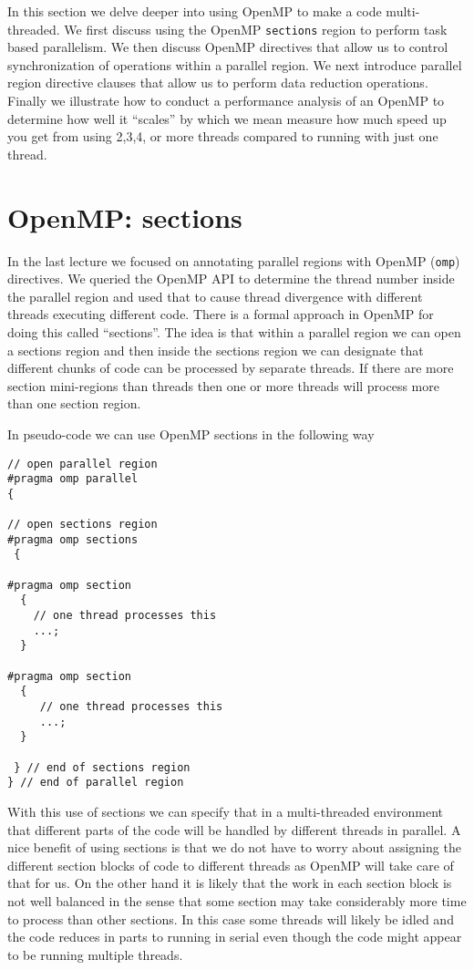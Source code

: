 
\minitoc


In this section we delve deeper into using OpenMP to make a code multi-threaded. We first discuss using the OpenMP \texttt{sections} region to perform task based parallelism. We then discuss OpenMP directives that allow us to control synchronization of operations within a parallel region. We next introduce parallel region directive clauses that allow us to perform data reduction operations. Finally we illustrate how to conduct a performance analysis of an OpenMP to determine how well it ``scales'' by which we mean measure how much speed up you get from using 2,3,4, or more threads compared to running with just one thread.

\section{OpenMP: sections}

In the last lecture we focused on annotating parallel regions with OpenMP (\texttt{omp}) directives. We queried the OpenMP API to determine the thread number inside the parallel region and used that to cause thread divergence with different threads executing different code. There is a formal approach in OpenMP for doing this called ``sections''. The idea is that within a parallel region we can open a sections region and then inside the sections region we can designate that different chunks of code can be processed by separate threads. If there are more section mini-regions than threads then one or more threads will process more than one section region.

In pseudo-code we can use OpenMP sections in the following way

\begin{verbatim}
// open parallel region
#pragma omp parallel 
{

// open sections region
#pragma omp sections
 {

#pragma omp section
  {
    // one thread processes this 
    ...;
  }

#pragma omp section 
  {
     // one thread processes this
     ...;
  }

 } // end of sections region
} // end of parallel region
\end{verbatim}

With this use of sections we can specify that in a multi-threaded environment that different parts of the code will be handled by different threads in parallel. A nice benefit of using sections is that we do not have to worry about assigning the different section blocks of code to different threads as OpenMP will take care of that for us. On the other hand it is likely that the work in each section block is not well balanced in the sense that some section may take considerably more time to process than other sections. In this case some threads will likely be idled and the code reduces in parts to running in serial even though the code might appear to be running multiple threads.

